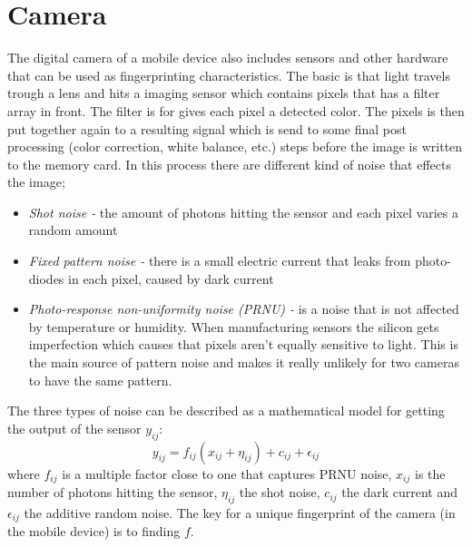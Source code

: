 \section{Camera}\label{sec:char:camera}
The digital camera of a mobile device also includes sensors and other hardware that can be used as fingerprinting characteristics. The basic is that light travels trough a lens and hits a imaging sensor which contains pixels that has a filter array in front. The filter is for gives each pixel a detected color. The pixels is then put together again to a resulting signal which is send to some final post processing (color correction, white balance, etc.) steps before the image is written to the memory card. In this process there are different kind of noise that effects the image;
\begin{itemize}
	\item[] \textit{Shot noise -} the amount of photons hitting the sensor and each pixel varies a random amount
	\item[] \textit{Fixed pattern noise - }there is a small electric current that leaks from photo-diodes in each pixel, caused by dark current
	\item[] \textit{Photo-response non-uniformity noise (PRNU) -} is a noise that is not affected by temperature or humidity. When manufacturing sensors the silicon gets imperfection which causes that pixels aren't equally sensitive to light. This is the main source of pattern noise and makes it really unlikely for two cameras to have the same pattern.
\end{itemize}
The three types of noise can be described as a mathematical model for getting the output of the sensor $y_{ij}$:
$$y_{ij}=f_{ij}(x_{ij}+\eta_{ij})+c_{ij}+\epsilon_{ij}$$
where $f_{ij}$ is a multiple factor close to one that captures PRNU noise, $x_{ij}$ is the number of photons hitting the sensor, $\eta_{ij}$ the shot noise, $c_{ij}$ the dark current and $\epsilon_{ij}$ the additive random noise. The key for a unique fingerprint of the camera (in the mobile device) is to finding $f$.
\cite[]{sensor:camera:DCIdent}


